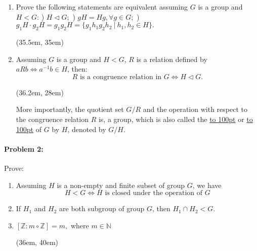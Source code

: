 \documentclass[12pt]{scrartcl}
\begin{document}
{{\begin{enumerate}[label=(\alph*)]
\vspace{0.2em}
	\item Prove the following statements are equivalent assuming $G$ is a group and $H<G$:
	) $H \lhd G;$
	) $gH=Hg, \forall g \in G;$
	) $g_1H \cdot g_2H = g_1g_2H =\{g_1h_1g_2h_2 ~ | ~ h_1, h_2 \in H\}.$

	\vspace{1em}	\begin{spacing}{1.3}
	\setlength{\leftskip}{18pt}	
	\framebox(35.5em, 35em){}
	\end{spacing}
	
\newpage
	\item \begin{spacing}{1.2}Assuming $G$ is a group and $H<G$, $R$ is a relation defined by $aRb \iff a^{-1}b \in H$, then: $$R\text{~is a congruence relation in~}G \iff H \lhd G.$$

	\framebox(36.2em, 28em){}

\vspace{1em}
More importantly, the quotient set $G/R$ and the operation with respect to the congruence relation $R$ is, a group, which is also called the \underline{\hbox to 100pt{}} or \underline{\hbox to 100pt{}} of $G$ by $H$, denoted by $G/H$.
\end{spacing}

	\end{enumerate}


\newpage

\paragraph*{Problem 2: }Prove:

\begin{enumerate}[label=(\alph*)]
	\item Assuming $H$ is a non-empty and finite subset of group $G$, we have $$H < G \Longleftrightarrow H \text{~is closed under the operation of~} G$$

\item \rule{0pt}{20pt}If $H_1$ and $H_2$ are both subgroup of group $G$, then $H_1 \cap H_2 < G$.

\item \rule{0pt}{20pt}$[\mathbb{Z}: m \circ \mathbb{Z}] = m,$ where $m \in \mathbb{N}$

\vspace{0.8em}
\framebox(36em, 40em){}


\end{enumerate}

}}
\end{document}
